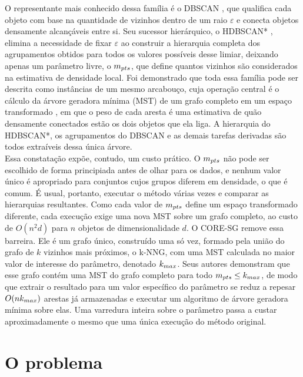 O representante mais conhecido dessa família é o \ac{DBSCAN} \cite{dbscan}, que qualifica cada objeto com base na quantidade de vizinhos dentro de um raio $\varepsilon$ e conecta objetos densamente alcançáveis entre si. Seu sucessor hierárquico, o \ac{HDBSCAN*} \cite{hdbscan}, elimina a necessidade de fixar $\varepsilon$ ao construir a hierarquia completa dos agrupamentos obtidos para todos os valores possíveis desse limiar, deixando apenas um parâmetro livre, o $m_{pts}$, que define quantos vizinhos são considerados na estimativa de densidade local. Foi demonstrado que toda essa família pode ser descrita como instâncias de um mesmo arcabouço, cuja operação central é o cálculo da árvore geradora mínima (\ac{MST}) de um grafo completo em um espaço transformado \cite{framework-density-clustering}, em que o peso de cada aresta é uma estimativa de quão densamente conectados estão os dois objetos que ela liga. A hierarquia do \ac{HDBSCAN*}, os agrupamentos do \ac{DBSCAN} e as demais tarefas derivadas são todos extraíveis dessa única árvore.\\

Essa constatação expõe, contudo, um custo prático. O $m_{pts}$ não pode ser escolhido de forma principiada antes de olhar para os dados, e nenhum valor único é apropriado para conjuntos cujos grupos diferem em densidade, o que é comum. É usual, portanto, executar o método várias vezes e comparar as hierarquias resultantes. Como cada valor de $m_{pts}$ define um espaço transformado diferente, cada execução exige uma nova \ac{MST} sobre um grafo completo, ao custo de $O(n^2 d)$ para $n$ objetos de dimensionalidade $d$. O \ac{CORE-SG} \cite{core-sg} remove essa barreira. Ele é um grafo único, construído uma só vez, formado pela união do grafo de $k$ vizinhos mais próximos, o \ac{k-NNG}, com uma \ac{MST} calculada no maior valor de interesse do parâmetro, denotado $k_{max}$. Seus autores demonstram que esse grafo contém uma \ac{MST} do grafo completo para todo $m_{pts} \leq k_{max}$, de modo que extrair o resultado para um valor específico do parâmetro se reduz a repesar $O(nk_{max})$ arestas já armazenadas e executar um algoritmo de árvore geradora mínima sobre elas. Uma varredura inteira sobre o parâmetro passa a custar aproximadamente o mesmo que uma única execução do método original.\\

\section{O problema\label{sec:problem-statement}}

